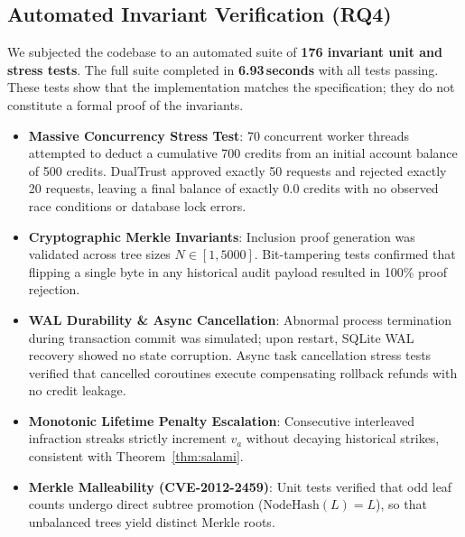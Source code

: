 \documentclass[journal]{IEEEtran}
\begin{document}
\subsection{Automated Invariant Verification (RQ4)}
We subjected the codebase to an automated suite of \textbf{176 invariant unit and stress tests}. The full suite completed in \textbf{6.93\,seconds} with all tests passing. These tests show that the implementation matches the specification; they do not constitute a formal proof of the invariants.
\begin{itemize}[leftmargin=12pt, topsep=2pt, itemsep=1pt]
\item \textbf{Massive Concurrency Stress Test}: 70 concurrent worker threads attempted to deduct a cumulative 700 credits from an initial account balance of 500 credits. DualTrust approved exactly 50 requests and rejected exactly 20 requests, leaving a final balance of exactly 0.0 credits with no observed race conditions or database lock errors.
\item \textbf{Cryptographic Merkle Invariants}: Inclusion proof generation was validated across tree sizes $N \in [1, 5000]$. Bit-tampering tests confirmed that flipping a single byte in any historical audit payload resulted in 100\% proof rejection.
\item \textbf{WAL Durability \& Async Cancellation}: Abnormal process termination during transaction commit was simulated; upon restart, SQLite WAL recovery showed no state corruption. Async task cancellation stress tests verified that cancelled coroutines execute compensating rollback refunds with no credit leakage.
\item \textbf{Monotonic Lifetime Penalty Escalation}: Consecutive interleaved infraction streaks strictly increment $v_a$ without decaying historical strikes, consistent with Theorem~\ref{thm:salami}.
\item \textbf{Merkle Malleability (CVE-2012-2459)}: Unit tests verified that odd leaf counts undergo direct subtree promotion ($\text{NodeHash}(L) = L$), so that unbalanced trees yield distinct Merkle roots.
\end{itemize}
\end{document}
